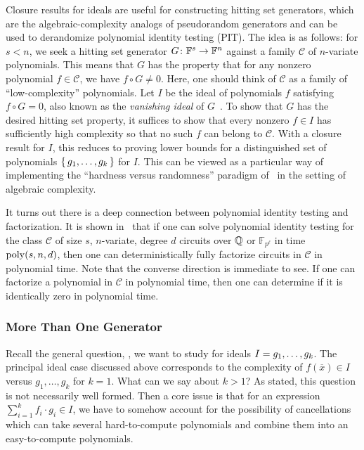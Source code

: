 \documentclass[letterpaper, 11pt]{amsart}
\begin{document}
Closure results for ideals are useful for constructing hitting set generators, which are the algebraic-complexity analogs of pseudorandom generators and can be used to derandomize polynomial identity testing (PIT).
The idea is as follows: for $s < n$, we seek a hitting set generator $G\colon \mathbb{F}^s \to \mathbb{F}^n$ against a family $\mathcal{C}$ of $n$-variate polynomials.
This means that $G$ has the property that for any nonzero polynomial $f \in \mathcal{C}$, we have $f \circ G \neq 0$.
Here, one should think of $\mathcal{C}$ as a family of ``low-complexity'' polynomials.
Let $I$ be the ideal of polynomials $f$ satisfying $f \circ G = 0$, also known as the \emph{vanishing ideal} of $G$~\cite{HvMM24}.
To show that $G$ has the desired hitting set property, it suffices to show that every nonzero $f \in I$ has sufficiently high complexity so that no such $f$ can belong to $\mathcal{C}$.
With a closure result for $I$, this reduces to proving lower bounds for a distinguished set of polynomials $\set{g_1, \dots, g_k}$ for $I$.
This can be viewed as a particular way of implementing the ``hardness versus randomness'' paradigm of~\cite{NW94, KI04} in the setting of algebraic complexity.

It turns out there is a deep connection between polynomial identity testing and factorization.
It is shown in~\cite{KSS15} that if one can solve polynomial identity testing for the class $\mathcal{C}$ of size $s$, $n$-variate, degree $d$ circuits over $\mathbb{Q}$ or $\mathbb{F}_{p^\ell}$ in time $\operatorname{poly}(s, n, d)$, then one can deterministically fully factorize circuits in $\mathcal{C}$ in polynomial time.
Note that the converse direction is immediate to see.
If one can factorize a polynomial in $\mathcal{C}$ in polynomial time, then one can determine if it is identically zero in polynomial time.
\fi

\subsubsection{More Than One Generator}

Recall the general question, , we want to study for ideals $I = \gen{g_1, \ldots, g_k}$.
The principal ideal case discussed above corresponds to the complexity of $f(\overline{x}) \in I$ versus $g_1, \ldots, g_k$ for $k = 1$.
What can we say about $k > 1$?
As stated, this question is not necessarily well formed.
Then a core issue is that for an expression $\sum_{i = 1}^k f_i \cdot g_i \in I$, we have to somehow account for the possibility of cancellations which can take several hard-to-compute polynomials and combine them into an easy-to-compute polynomials.
\end{document}

